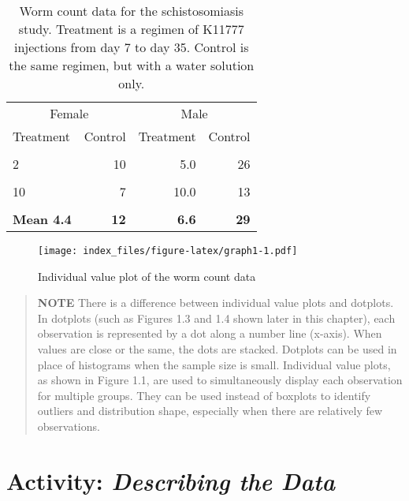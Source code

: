 \documentclass[
]{report}
\begin{document}
\begin{table}[!h]
\centering
\caption{\label{tab:table1}Worm count data for the schistosomiasis study. Treatment is a regimen of K11777 injections from day 7 to day 35. Control is the same regimen, but with a water solution only.}
\centering
\fontsize{10}{12}\selectfont
\begin{tabular}[t]{lrrr}
\toprule
\multicolumn{2}{c}{Female} & \multicolumn{2}{c}{Male} \\
\cmidrule(l{3pt}r{3pt}){1-2} \cmidrule(l{3pt}r{3pt}){3-4}
Treatment & Control & Treatment & Control\\
\midrule
\cellcolor{gray!10}{1} & \cellcolor{gray!10}{16} & \cellcolor{gray!10}{3.0} & \cellcolor{gray!10}{31}\\
2 & 10 & 5.0 & 26\\
\cellcolor{gray!10}{2} & \cellcolor{gray!10}{10} & \cellcolor{gray!10}{9.0} & \cellcolor{gray!10}{28}\\
10 & 7 & 10.0 & 13\\
\cellcolor{gray!10}{7} & \cellcolor{gray!10}{17} & \cellcolor{gray!10}{6.0} & \cellcolor{gray!10}{47}\\
\addlinespace
\textbf{Mean 4.4} & \textbf{12} & \textbf{6.6} & \textbf{29}\\
\bottomrule
\end{tabular}
\end{table}

\begin{figure}
\centering
\texttt{[image: index\_files/figure-latex/graph1-1.pdf]}
\caption{\label{fig:graph1}Individual value plot of the worm count data}
\end{figure}

\newpage

\begin{quote}
\textbf{NOTE}
There is a difference between individual value plots and dotplots. In dotplots (such as Figures 1.3 and
1.4 shown later in this chapter), each observation is represented by a dot along a number line (x-axis).
When values are close or the same, the dots are stacked. Dotplots can be used in place of histograms
when the sample size is small. Individual value plots, as shown in Figure 1.1, are used to simultaneously
display each observation for multiple groups. They can be used instead of boxplots to identify outliers and distribution shape, especially when there are relatively few observations.
\end{quote}

\section*{\texorpdfstring{Activity: \emph{Describing the Data}}{Activity: Describing the Data}}\label{activity-describing-the-data}
\end{document}
